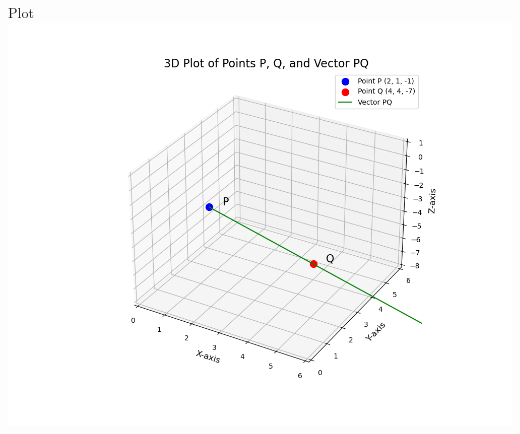 \documentclass{beamer}
\begin{document}
\begin{frame}{Plot}
    \centering
    \includegraphics[width=\columnwidth, height=0.8\textheight, keepaspectratio]{figs/fig1.png}     
\end{frame}
\end{document}

